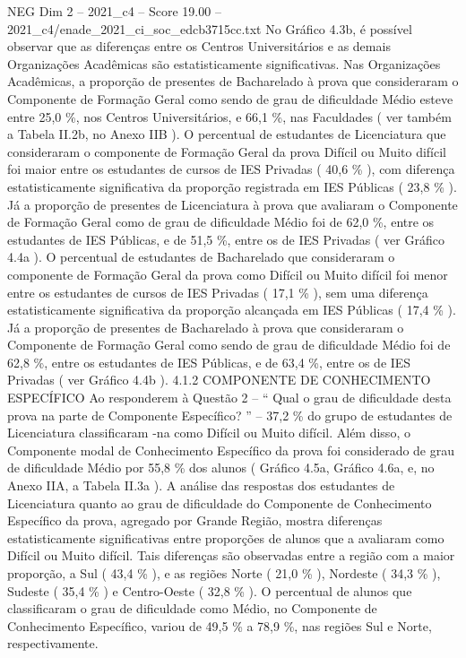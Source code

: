 \begin{textsample}{NEG Dim 2 – 2021\_c4 – Score 19.00 – 2021\_c4/enade\_2021\_ci\_soc\_edcb3715cc.txt}
No Gráfico 4.3b, é possível observar que as diferenças entre os Centros Universitários e as demais Organizações Acadêmicas são estatisticamente significativas.
Nas Organizações Acadêmicas, a proporção de presentes de Bacharelado à prova que consideraram o Componente de Formação Geral como sendo de grau de dificuldade Médio esteve entre 25,0 \%, nos Centros Universitários, e 66,1 \%, nas Faculdades ( ver também a Tabela II.2b, no Anexo IIB ).
O percentual de estudantes de Licenciatura que consideraram o componente de Formação Geral da prova Difícil ou Muito difícil foi maior entre os estudantes de cursos de IES Privadas ( 40,6 \% ), com diferença estatisticamente significativa da proporção registrada em IES Públicas ( 23,8 \% ).
Já a proporção de presentes de Licenciatura à prova que avaliaram o Componente de Formação Geral como de grau de dificuldade Médio foi de 62,0 \%, entre os estudantes de IES Públicas, e de 51,5 \%, entre os de IES Privadas ( ver Gráfico 4.4a ).
O percentual de estudantes de Bacharelado que consideraram o componente de Formação Geral da prova como Difícil ou Muito difícil foi menor entre os estudantes de cursos de IES Privadas ( 17,1 \% ), sem uma diferença estatisticamente significativa da proporção alcançada em IES Públicas ( 17,4 \% ).
Já a proporção de presentes de Bacharelado à prova que consideraram o Componente de Formação Geral como sendo de grau de dificuldade Médio foi de 62,8 \%, entre os estudantes de IES Públicas, e de 63,4 \%, entre os de IES Privadas ( ver Gráfico 4.4b ). 4.1.2 COMPONENTE DE CONHECIMENTO ESPECÍFICO Ao responderem à Questão 2 – “ Qual o grau de dificuldade desta prova na parte de Componente Específico? ” – 37,2 \% do grupo de estudantes de Licenciatura classificaram -na como Difícil ou Muito difícil.
Além disso, o Componente modal de Conhecimento Específico da prova foi considerado de grau de dificuldade Médio por 55,8 \% dos alunos ( Gráfico 4.5a, Gráfico 4.6a, e, no Anexo IIA, a Tabela II.3a ).
A análise das respostas dos estudantes de Licenciatura quanto ao grau de dificuldade do Componente de Conhecimento Específico da prova, agregado por Grande Região, mostra diferenças estatisticamente significativas entre proporções de alunos que a avaliaram como Difícil ou Muito difícil.
Tais diferenças são observadas entre a região com a maior proporção, a Sul ( 43,4 \% ), e as regiões Norte ( 21,0 \% ), Nordeste ( 34,3 \% ), Sudeste ( 35,4 \% ) e Centro-Oeste ( 32,8 \% ).
O percentual de alunos que classificaram o grau de dificuldade como Médio, no Componente de Conhecimento Específico, variou de 49,5 \% a 78,9 \%, nas regiões Sul e Norte, respectivamente.

\end{textsample}
